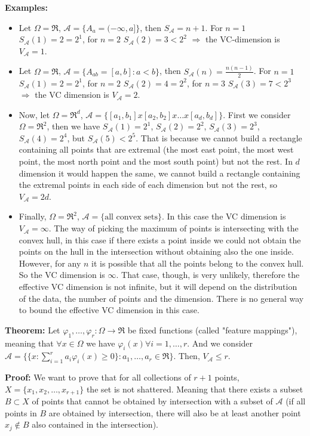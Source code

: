 \documentclass[11pt, english]{article}
\begin{document}
\textbf{Examples:}
\begin{itemize}
	\item Let $\Omega=\Re$, $\mathcal{A}=\{A_a=(-\infty,a]\}$, then $S_{\mathcal{A}}=n+1$. For $n=1$ $S_{\mathcal{A}}(1)=2=2^1$, for $n=2$ $S_{\mathcal{A}}(2)=3<2^2$ $\Longrightarrow$ the VC-dimension is $V_{\mathcal{A}}=1$.
	\item Let $\Omega=\Re$, $\mathcal{A}=\{A_{ab}=[a,b]: a<b\}$, then $S_{\mathcal{A}}(n)=\frac{n(n-1)}{2}$. For $n=1$ $S_{\mathcal{A}}(1)=2=2^1$, for $n=2$ $S_{\mathcal{A}}(2)=4=2^2$, for $n=3$ $S_{\mathcal{A}}(3)=7<2^3$ $\Longrightarrow$ the VC dimension is $V_{\mathcal{A}}=2$.
	\item Now, let $\Omega=\Re^d$, $\mathcal{A}=\{[a_1,b_1]x[a_2,b_2]x\dots x[a_d,b_d]\}$. First we consider $\Omega=\Re^2$, then we have $S_{\mathcal{A}}(1)=2^1$, $S_{\mathcal{A}}(2)=2^2$, $S_{\mathcal{A}}(3)=2^3$, $S_{\mathcal{A}}(4)=2^4$, but $S_{\mathcal{A}}(5)<2^5$. That is because we cannot build a rectangle containing all points that are extremal (the most east point, the most west point, the most north point and the most south point) but not the rest. In $d$ dimension it would happen the same, we cannot build a rectangle containing the extremal points in each side of each dimension but not the rest, so $V_{\mathcal{A}}=2d$.
	\item Finally, $\Omega=\Re^2$, $\mathcal{A}=\{\text{all convex sets}\}$. In this case the VC dimension is $V_{\mathcal{A}}=\infty$. The way of picking the maximum of points is intersecting with the convex hull, in this case if there exists a point inside we could not obtain the points on the hull in the intersection without obtaining also the one inside. However, for any $n$ it is possible that all the points belong to the convex hull. So the VC dimension is $\infty$. That case, though, is very unlikely, therefore the effective VC dimension is not infinite, but it will depend on the distribution of the data, the number of points and the dimension. There is no general way to bound the effective VC dimension in this case.
\end{itemize} 
\textbf{Theorem:} Let $\varphi_1,\dots,\varphi_r:\Omega\longrightarrow\Re$ be fixed functions (called "feature mappings"), meaning that $\forall x\in \Omega$ we have $\varphi_i(x)\forall i=1,\dots,r$. And we consider $\mathcal{A}=\{\{x:\sum\limits_{i=1}^ra_i\varphi_i(x)\geq 0\}:a_1,\dots,a_r\in\Re\}$. Then, $V_{\mathcal{A}}\leq r$.

\textbf{Proof:} We want to prove that for all collections of $r+1$ points, $X=\{x_1,x_2,\dots,x_{r+1}\}$ the set is not shattered. Meaning that there exists a subset $B\subset X$ of points that cannot be obtained by intersection with a subset of $\mathcal{A}$ (if all points in $B$ are obtained by intersection, there will also be at least another point $x_j\notin B$ also contained in the intersection).\\
\end{document}
